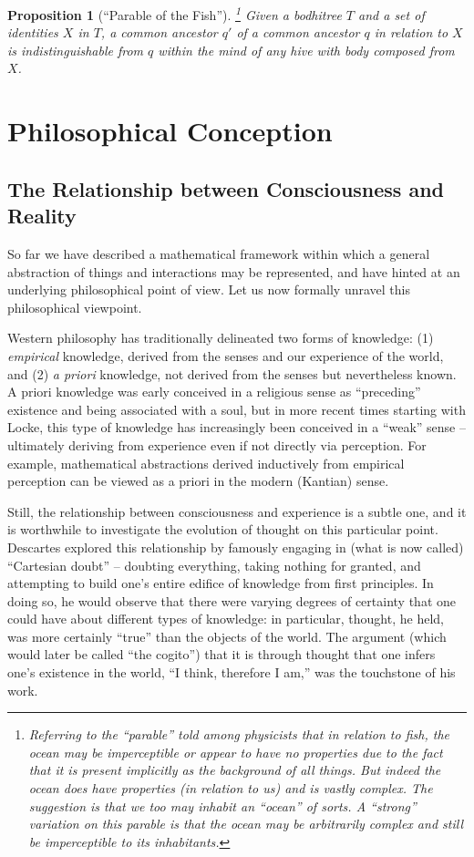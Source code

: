 \documentclass[pra,twocolumn,groupedaddress,10pt]{revtex4}
\newtheorem{proposition}[theorem]{Proposition}
\theoremstyle{definition}
\begin{document}
\begin{proposition}[``Parable of the Fish'']\footnote{Referring to the ``parable'' told among physicists that in relation to fish, the ocean may be imperceptible or appear to have no properties due to the fact that it is present implicitly as the background of all things. But indeed the ocean does have properties (in relation to us) and is vastly complex. The suggestion is that we too may inhabit an ``ocean'' of sorts. A ``strong'' variation on this parable is that the ocean may be \emph{arbitrarily} complex and still be imperceptible to its inhabitants.}
	Given a bodhitree $T$ and a set of identities $X$ in $T$, a common ancestor $q'$ of a common ancestor $q$ in relation to $X$ is indistinguishable from $q$ within the mind of any hive with body composed from $X$.
\end{proposition}

\section{Philosophical Conception} \label{sec:phicon}

\subsection{The Relationship between Consciousness and Reality}

So far we have described a mathematical framework within which a general abstraction of things and interactions may be represented, and have hinted at an underlying philosophical point of view. Let us now formally unravel this philosophical viewpoint.

Western philosophy has traditionally delineated two forms of knowledge: (1) \emph{empirical} knowledge, derived from the senses and our experience of the world, and (2) \emph{a priori} knowledge, not derived from the senses but nevertheless known. A priori knowledge was early conceived in a religious sense as ``preceding'' existence and being associated with a soul, but in more recent times starting with Locke\cite{russell}, this type of knowledge has increasingly been conceived in a ``weak'' sense -- ultimately deriving from experience even if not directly via perception. For example, mathematical abstractions derived inductively from empirical perception can be viewed as a priori in the modern (Kantian\cite{kant}) sense.

Still, the relationship between consciousness and experience is a subtle one, and it is worthwhile to investigate the evolution of thought on this particular point. Descartes\cite{descartes} explored this relationship by famously engaging in (what is now called) ``Cartesian doubt'' -- doubting everything, taking nothing for granted, and attempting to build one's entire edifice of knowledge from first principles. In doing so, he would observe that there were varying degrees of certainty that one could have about different types of knowledge: in particular, thought, he held, was more certainly ``true'' than the objects of the world. The argument (which would later be called ``the cogito'') that it is through thought that one infers one's existence in the world, ``I think, therefore I am,'' was the touchstone of his work.
\end{document}

